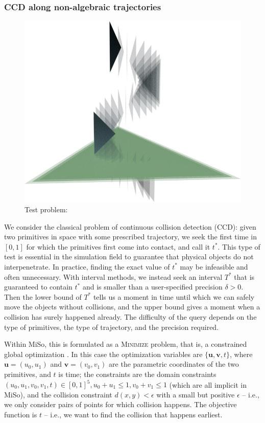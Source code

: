 \subsubsection{CCD along non-algebraic trajectories}
\begin{figure}
	\centering
	\includegraphics[width=0.8\linewidth]{fig/spiral.png}
	\caption{Test problem: }
	\label{fig:tori}
\end{figure}
We consider the classical problem of continuous collision detection (CCD): given two primitives in space with some prescribed trajectory, we seek the first time in $[0,1]$ for which the primitives first come into contact, and call it $t^*$.
This type of test is essential in the simulation field to guarantee that physical objects do not interpenetrate.
In practice, finding the exact value of $t^*$ may be infeasible and often unnecessary. With interval methods, we instead seek an interval $T^*$ that is guaranteed to contain $t^*$ and is smaller than a user-specified precision $\delta>0$.
Then the lower bound of $T^*$ tells us a moment in time until which we can safely move the objects without collisions, and the upper bound gives a moment when a collision has surely happened already.
The difficulty of the query depends on the type of primitives, the type of trajectory, and the precision required.

Within MiSo, this is formulated as a \textsc{Minimize} problem, that is, a constrained global optimization \cite{Sichetti2025}.
In this case the optimization variables are $\{\mathbf{u}, \mathbf{v}, t\}$, where $\mathbf{u}=(u_0, u_1)$ and $\mathbf{v}=(v_0, v_1)$ are the parametric coordinates of the two primitives, and $t$ is time;
the constraints are the domain constraints $(u_0,u_1,v_0,v_1,t)\in[0,1]^5, u_0+u_1\leq1, v_0+v_1\leq1$ (which are all implicit in MiSo), and the collision constraint $d(x,y)<\epsilon$ with a small but positive $\epsilon$ -- i.e., we only consider pairs of points for which collision happens.
The objective function is $t$ -- i.e., we want to find the collision that happens earliest.

